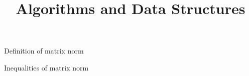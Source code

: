 \documentclass[11pt,compress,t,notes=noshow, xcolor=table]{beamer}
\title{Algorithms and Data Structures}
\begin{document}
{
  \item Definition of matrix norm
  \item Inequalities of matrix norm
}


% 
\end{document}
